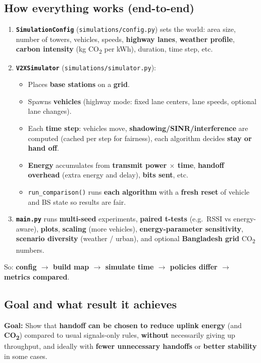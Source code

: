 \documentclass[11pt,a4paper]{article}
\begin{document}
\begin{assistmsg}
\subsection*{How everything works (end-to-end)}

\begin{enumerate}[label=\arabic*.]
\item \textbf{\texttt{SimulationConfig}} (\texttt{simulations/config.py}) sets the world: area size, number of towers, vehicles, speeds, \textbf{highway lanes}, \textbf{weather profile}, \textbf{carbon intensity} (kg CO\textsubscript{2} per kWh), duration, time step, etc.
\item \textbf{\texttt{V2XSimulator}} (\texttt{simulations/simulator.py}):
  \begin{itemize}
  \item Places \textbf{base stations} on a \textbf{grid}.
  \item Spawns \textbf{vehicles} (highway mode: fixed lane centers, lane speeds, optional lane changes).
  \item Each \textbf{time step}: vehicles move, \textbf{shadowing/SINR/interference} are computed (cached per step for fairness), each algorithm decides \textbf{stay or hand off}.
  \item \textbf{Energy} accumulates from \textbf{transmit power $\times$ time}, \textbf{handoff overhead} (extra energy and delay), \textbf{bits sent}, etc.
  \item \texttt{run\_comparison()} runs \textbf{each algorithm} with a \textbf{fresh reset} of vehicle and BS state so results are fair.
  \end{itemize}
\item \textbf{\texttt{main.py}} runs \textbf{multi-seed} experiments, \textbf{paired t-tests} (e.g.\ RSSI vs energy-aware), \textbf{plots}, \textbf{scaling} (more vehicles), \textbf{energy-parameter sensitivity}, \textbf{scenario diversity} (weather / urban), and optional \textbf{Bangladesh grid} CO\textsubscript{2} numbers.
\end{enumerate}

So: \textbf{config $\rightarrow$ build map $\rightarrow$ simulate time $\rightarrow$ policies differ $\rightarrow$ metrics compared}.

\subsection*{Goal and what result it achieves}

\textbf{Goal:} Show that \textbf{handoff can be chosen to reduce uplink energy} (and \textbf{CO\textsubscript{2}}) compared to usual signals-only rules, \textbf{without} necessarily giving up throughput, and ideally with \textbf{fewer unnecessary handoffs} or \textbf{better stability} in some cases.


\end{assistmsg}
\end{document}
